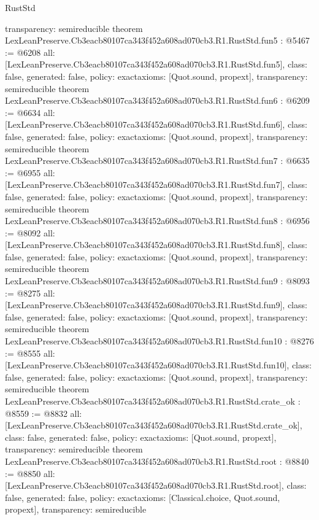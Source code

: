 \begin{lexlean}{RustStd}
\begin{coremodule}
{  transparency: semireducible
}
theorem LexLeanPreserve.Cb3eacb80107ca343f452a608ad070cb3.R1.RustStd.fun5 : @5467 := @6208 {
  all: [LexLeanPreserve.Cb3eacb80107ca343f452a608ad070cb3.R1.RustStd.fun5],
  class: false,
  generated: false,
  policy: exact{axioms: [Quot.sound, propext]},
  transparency: semireducible
}
theorem LexLeanPreserve.Cb3eacb80107ca343f452a608ad070cb3.R1.RustStd.fun6 : @6209 := @6634 {
  all: [LexLeanPreserve.Cb3eacb80107ca343f452a608ad070cb3.R1.RustStd.fun6],
  class: false,
  generated: false,
  policy: exact{axioms: [Quot.sound, propext]},
  transparency: semireducible
}
theorem LexLeanPreserve.Cb3eacb80107ca343f452a608ad070cb3.R1.RustStd.fun7 : @6635 := @6955 {
  all: [LexLeanPreserve.Cb3eacb80107ca343f452a608ad070cb3.R1.RustStd.fun7],
  class: false,
  generated: false,
  policy: exact{axioms: [Quot.sound, propext]},
  transparency: semireducible
}
theorem LexLeanPreserve.Cb3eacb80107ca343f452a608ad070cb3.R1.RustStd.fun8 : @6956 := @8092 {
  all: [LexLeanPreserve.Cb3eacb80107ca343f452a608ad070cb3.R1.RustStd.fun8],
  class: false,
  generated: false,
  policy: exact{axioms: [Quot.sound, propext]},
  transparency: semireducible
}
theorem LexLeanPreserve.Cb3eacb80107ca343f452a608ad070cb3.R1.RustStd.fun9 : @8093 := @8275 {
  all: [LexLeanPreserve.Cb3eacb80107ca343f452a608ad070cb3.R1.RustStd.fun9],
  class: false,
  generated: false,
  policy: exact{axioms: [Quot.sound, propext]},
  transparency: semireducible
}
theorem LexLeanPreserve.Cb3eacb80107ca343f452a608ad070cb3.R1.RustStd.fun10 : @8276 := @8555 {
  all: [LexLeanPreserve.Cb3eacb80107ca343f452a608ad070cb3.R1.RustStd.fun10],
  class: false,
  generated: false,
  policy: exact{axioms: [Quot.sound, propext]},
  transparency: semireducible
}
theorem LexLeanPreserve.Cb3eacb80107ca343f452a608ad070cb3.R1.RustStd.crate_ok : @8559 := @8832 {
  all: [LexLeanPreserve.Cb3eacb80107ca343f452a608ad070cb3.R1.RustStd.crate_ok],
  class: false,
  generated: false,
  policy: exact{axioms: [Quot.sound, propext]},
  transparency: semireducible
}
theorem LexLeanPreserve.Cb3eacb80107ca343f452a608ad070cb3.R1.RustStd.root : @8840 := @8850 {
  all: [LexLeanPreserve.Cb3eacb80107ca343f452a608ad070cb3.R1.RustStd.root],
  class: false,
  generated: false,
  policy: exact{axioms: [Classical.choice, Quot.sound, propext]},
  transparency: semireducible
}


\end{coremodule}
\end{lexlean}
